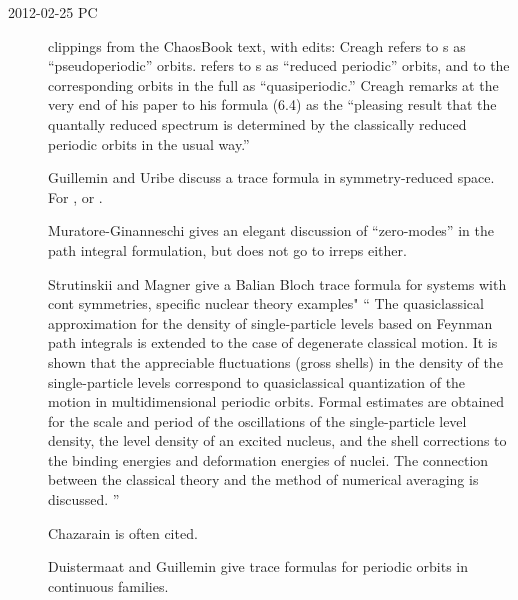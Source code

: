 \begin{description}
\item[2012-02-25 PC] clippings from the ChaosBook text, with edits:             \toCB
Creagh refers to \rpo s as ``pseudoperiodic'' orbits.
  refers to \rpo s as ``reduced periodic'' orbits, and
to the corresponding orbits in the full {\statesp} as ``quasiperiodic.''
Creagh remarks at the very end of his paper to his formula (6.4) as the
``pleasing result that the quantally reduced spectrum is determined by
the classically reduced periodic orbits in the usual way.'' 

Guillemin and Uribe discuss a trace formula in
symmetry-reduced space. For 
, or
.

Muratore-Ginanneschi gives an elegant
discussion of ``zero-modes'' in the path integral formulation, but does
not go to irreps either.

Strutinskii and  Magner give a
Balian Bloch trace formula for systems with cont symmetries,
specific nuclear theory examples" ``
The quasiclassical approximation for the density of single-particle
levels based on {Feynman} path integrals is extended to the case of
degenerate classical motion. It is shown that the appreciable
fluctuations (gross shells) in the density of the single-particle levels
correspond to quasiclassical quantization of the motion in
multidimensional periodic orbits. Formal estimates are obtained for the
scale and period of the oscillations of the single-particle level
density, the level density of an excited nucleus, and the shell
corrections to the binding energies and deformation energies of nuclei.
The connection between the classical theory and the method of numerical
averaging is discussed.
''

Chazarain is often cited.


Duistermaat and Guillemin give
trace formulas for periodic orbits in continuous families.


\end{description}


